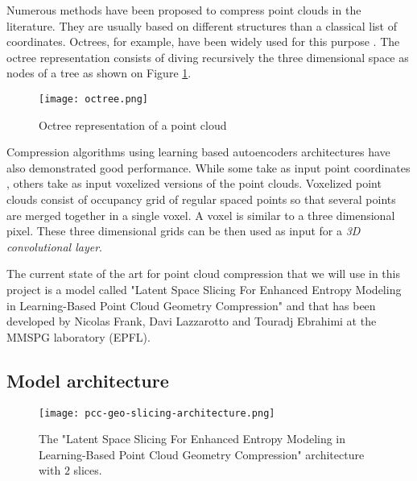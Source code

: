 \label{chapter:sota-pcc}

Numerous methods have been proposed to compress point clouds in the literature. They are usually based on different structures than a classical list of coordinates.                                
Octrees, for example, have been widely used for this purpose \cite{bib:octree}. 
The octree representation consists of diving recursively the three dimensional space as nodes of a tree as shown on Figure \ref{fig:octree}.

\begin{figure}
    \centering
    \texttt{[image: octree.png]}
    \caption{Octree representation of a point cloud}
    \label{fig:octree}
\end{figure}


Compression algorithms using learning based autoencoders architectures have also demonstrated good performance. While some take as input point coordinates \cite{bib:9102866}, others take as input voxelized versions of the point clouds. 
Voxelized point clouds consist of occupancy grid of regular spaced points so that several points are merged together in a single voxel.
A voxel is similar to a three dimensional pixel.
These three dimensional grids can be then used as input for a \textit{3D convolutional layer}.


The current state of the art for point cloud compression that we will use in this project is a model called "Latent Space Slicing For Enhanced Entropy Modeling in Learning-Based Point Cloud Geometry Compression" and that has been developed by Nicolas Frank, Davi Lazzarotto and Touradj Ebrahimi at the MMSPG laboratory (EPFL).

\subsection{Model architecture}

\begin{figure}
    \centering
    \texttt{[image: pcc-geo-slicing-architecture.png]}
    \caption{The "Latent Space Slicing For Enhanced Entropy Modeling in Learning-Based Point Cloud Geometry Compression" architecture with $2$ slices.}
    \label{fig:pcc-geo-slicing-architecture}
\end{figure}

